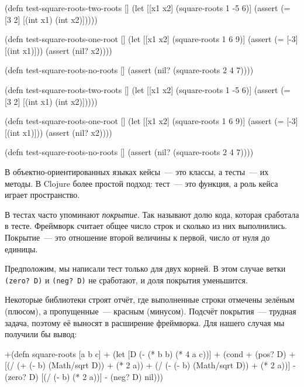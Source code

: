 \ifnarrow

\begin{english}
  \begin{clojure}
(defn test-square-roots-two-roots []
  (let [[x1 x2] (square-roots 1 -5 6)]
    (assert
      (= [3 2]
         [(int x1) (int x2)]))))

(defn test-square-roots-one-root []
  (let [[x1 x2] (square-roots 1 6 9)]
    (assert (= [-3] [(int x1)]))
    (assert (nil? x2))))

(defn test-square-roots-no-roots []
  (assert (nil? (square-roots 2 4 7))))
  \end{clojure}
\end{english}

\else

\begin{english}
  \begin{clojure}
(defn test-square-roots-two-roots []
  (let [[x1 x2] (square-roots 1 -5 6)]
    (assert (= [3 2] [(int x1) (int x2)]))))

(defn test-square-roots-one-root []
  (let [[x1 x2] (square-roots 1 6 9)]
    (assert (= [-3] [(int x1)]))
    (assert (nil? x2))))

(defn test-square-roots-no-roots []
  (assert (nil? (square-roots 2 4 7))))
  \end{clojure}
\end{english}

\fi

В объектно-ориентированных языках кейсы~--- это классы, а тесты~--- их методы. В
Clojure более простой подход: тест~--- это функция, а роль кейса играет
пространство.


В тестах часто упоминают \emph{покрытие}. Так называют долю кода, которая
сработала в тесте. Фреймворк считает общее число строк и сколько из них
выполнились. Покрытие~--- это отношение второй величины к первой, число от нуля
до единицы.

Предположим, мы написали тест только для двух корней. В этом случае ветки
\verb|(zero? D)| и \verb|(neg? D)| не сработают, и доля покрытия уменьшится.

Некоторые библиотеки строят отчёт, где выполненные строки отмечены зелёным
(плюсом), а пропущенные~--- красным (минусом). Подсчёт покрытия~--- трудная
задача, поэтому её выносят в расширение фреймворка. Для нашего случая мы
получили бы вывод:

\ifnarrow

\begin{english}
  \begin{diff}
+(defn square-roots [a b c]
+  (let [D (- (* b b) (* 4 a c))]
+    (cond
+      (pos? D)
+      [(/ (+ (- b) (Math/sqrt D))
+          (* 2 a))
+       (/ (- (- b) (Math/sqrt D))
+          (* 2 a))]
-      (zero? D) [(/ (- b) (* 2 a))]
-      (neg? D) nil)))
  \end{diff}
\end{english}


